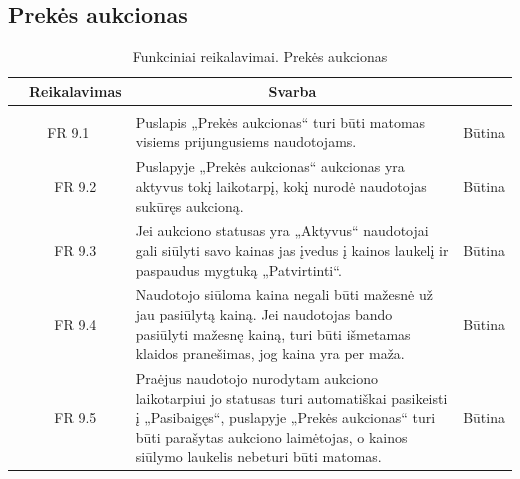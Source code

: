 \documentclass{VUMIFPSkursinis}
\begin{document}
	\subsection{Prekės aukcionas}
	\begin{table}[H]
		\caption{Funkciniai reikalavimai. Prekės aukcionas}
		\begin{tabular}{|p{1cm}|p{1cm}|p{}|p{}|}
			\hline 
			\rowcolor{gray!50}
			\multicolumn{2}{|c|}{{\bfseries Kodas}}&
			\multicolumn{1}{c|}{{\bfseries Reikalavimas}}&
			\multicolumn{1}{c|}{{\bfseries Svarba}}\\
			\hline
			\rowcolor{lightgray}
			\multicolumn{4}{|c|}{Prekės aukcionas}\\				
			\hline
			\multicolumn{2}{|c|}{FR 9.1}&
			{Puslapis „Prekės aukcionas“ turi būti matomas visiems prijungusiems naudotojams.
			}&		
			\multicolumn{1}{c|}{Būtina}\\
			\hline
			\multicolumn{1}{|c}{}&
			\multicolumn{1}{c|}{FR 9.2}&
			{Puslapyje „Prekės aukcionas“ aukcionas yra aktyvus tokį laikotarpį, kokį nurodė naudotojas sukūręs aukcioną.
			}&		
			\multicolumn{1}{c|}{Būtina}\\
			\hline	
			\multicolumn{1}{|c}{}&
			\multicolumn{1}{c|}{FR 9.3}&
			{Jei aukciono statusas yra „Aktyvus“ naudotojai gali siūlyti savo kainas jas įvedus į kainos laukelį ir paspaudus mygtuką „Patvirtinti“.
			}&
			\multicolumn{1}{c|}{Būtina}\\									
			\hline
			\multicolumn{1}{|c}{}&
			\multicolumn{1}{c|}{FR 9.4}&
			{Naudotojo siūloma kaina negali būti mažesnė už jau pasiūlytą kainą. Jei naudotojas bando pasiūlyti mažesnę kainą, turi būti išmetamas klaidos pranešimas, jog kaina yra per maža.
			}&
			\multicolumn{1}{c|}{Būtina}\\									
			\hline
			\multicolumn{1}{|c}{}&
			\multicolumn{1}{c|}{FR 9.5}&
			{Praėjus naudotojo nurodytam aukciono laikotarpiui jo statusas turi automatiškai pasikeisti į „Pasibaigęs“, puslapyje „Prekės aukcionas“ turi būti parašytas aukciono laimėtojas, o kainos siūlymo laukelis nebeturi būti matomas.
			}&
			\multicolumn{1}{c|}{Būtina}\\									
			\hline
		\end{tabular}		
	\end{table}
	
\end{document}

